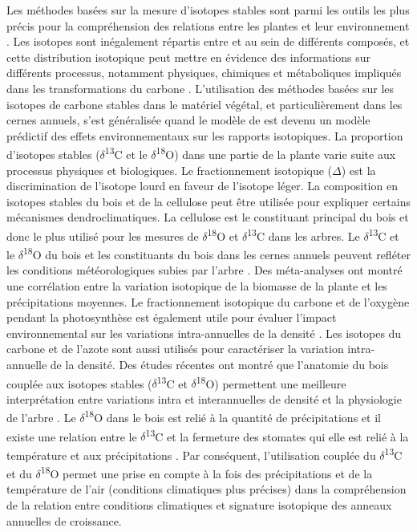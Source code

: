 \documentclass{report}
\newcommand{\Ctreize}{$\delta$\textsuperscript{13}C\xspace}
\newcommand{\Odixhuit}{$\delta$\textsuperscript{18}O\xspace}
\begin{document}
Les méthodes basées sur la mesure d'isotopes stables sont parmi les outils les plus précis pour la compréhension des relations entre les plantes et leur environnement \citep{Dawson2002}. Les isotopes sont inégalement répartis entre et au sein de différents composés, et cette distribution isotopique peut mettre en évidence des informations sur différents processus, notamment physiques, chimiques et métaboliques impliqués dans les transformations du carbone \citep{Farquhar1989}. L'utilisation des méthodes basées sur les isotopes de carbone stables dans le matériel végétal, et particulièrement dans les cernes annuels, s'est généralisée quand le modèle de \cite{Farquhar1989} est devenu un modèle prédictif des effets environnementaux sur les rapports isotopiques. La proportion d'isotopes stables (\Ctreize et le \Odixhuit) dans une partie de la plante varie suite aux processus physiques et biologiques. Le fractionnement isotopique ($\Delta$) est la discrimination de l'isotope lourd en faveur de l'isotope léger. La composition en isotopes stables du bois et de la cellulose peut être utilisée pour expliquer certains mécanismes dendroclimatiques. La cellulose est le constituant principal du bois et donc le plus utilisé pour les mesures de \Odixhuit et \Ctreize dans les arbres. Le \Ctreize et le \Odixhuit du bois et les constituants du bois dans les cernes annuels peuvent refléter les conditions météorologiques subies par l'arbre \citep{Duquesnay1998,McCarroll2004,Hartl-meier2015}. Des méta-analyses ont montré une corrélation entre la variation isotopique de la biomasse de la plante et les précipitations moyennes. Le fractionnement isotopique du carbone et de l'oxygène pendant la photosynthèse est également utile pour évaluer l'impact environnemental sur les variations intra-annuelles de la densité \citep{Farquhar1989,JonLloyd1994}. Les isotopes du carbone et de l'azote sont aussi utilisés pour caractériser la variation intra-annuelle de la densité. Des études récentes ont montré que l'anatomie du bois couplée aux isotopes stables (\Ctreize et \Odixhuit) permettent une meilleure interprétation entre variations intra et interannuelles de densité et la physiologie de l'arbre \citep{Micco2007,Vaganov2009,Sarris2013}. Le \Odixhuit dans le bois est relié à la quantité de précipitations \citep{Bonal2000} et il existe une relation entre le \Ctreize et la fermeture des stomates qui elle est relié à la température et aux précipitations \citep{Pons2011}. Par conséquent, l'utilisation couplée du \Ctreize et du \Odixhuit permet une prise en compte à la fois des précipitations et de la température de l'air (conditions climatiques plus précises) dans la compréhension de la relation entre conditions climatiques et signature isotopique des anneaux annuelles de croissance. \\ %
\end{document}
